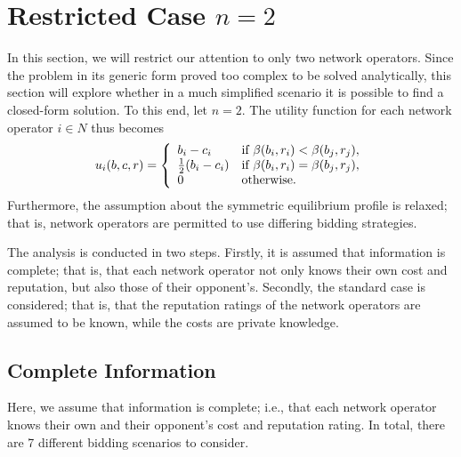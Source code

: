 \section{Restricted Case $n=2$} %
\label{sec:direct_restricted_case_n_2_direct}
In this section, we will restrict our attention to only two network operators. Since the problem in its generic form proved too complex to be solved analytically, this section will explore whether in a much simplified scenario it is possible to find a closed-form solution. To this end, let $n=2$. The utility function for each network operator $i\in N$ thus becomes
\begin{equation}
	\label{eq:utility_n_2_direct}
	u_i(b,c,r) = \left\{
	\begin{array}{l l}
		b_i - c_i &\text{if } \beta(b_i,r_i) < \beta(b_j,r_j),\\
		\frac{1}{2}(b_i - c_i) &\text{if } \beta(b_i,r_i) = \beta(b_j,r_j),\\
		0 &\text{otherwise}.
	\end{array}\right.
\end{equation}
Furthermore, the assumption about the symmetric equilibrium profile is relaxed; that is, network operators are permitted to use differing bidding strategies.

The analysis is conducted in two steps. Firstly, it is assumed that information is complete; that is, that each network operator not only knows their own cost and reputation, but also those of their opponent's. Secondly, the standard case is considered; that is, that the reputation ratings of the network operators are assumed to be known, while the costs are private knowledge.

\subsection{Complete Information} %
\label{sub:complete_information_n_2_direct}
Here, we assume that information is complete; i.e., that each network operator knows their own and their opponent's cost and reputation rating. In total, there are 7 different bidding scenarios to consider.

